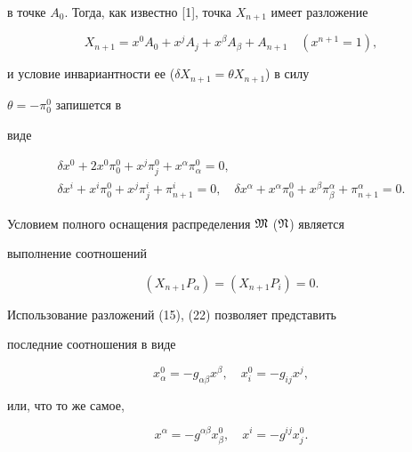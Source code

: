 в точке $A_0$. Тогда, как известно [1], точка $X_{n+1}$ имеет разложение 


\begin{equation} 


X_{n+1}=x^0A_0+x^j A_j+x^\beta A_\beta+A_{n+1}\quad 


(x^{n+1}=1), 


\end{equation} 


и условие инвариантности ее ($\delta X_{n+1}=\theta X_{n+1}$) в силу 


$\theta=-\pi^0_0$ запишется в 


виде 


\begin{equation} 


\begin{array}{c} 


\delta x^0+2x^0\pi^0_0+x^j\pi^0_j+x^\alpha\pi^0_\alpha=0,\\[2mm] 


\delta x^i+x^i\pi^0_0+x^j\pi^i_j+\pi^i_{n+1}=0,\quad 


\delta x^\alpha+x^\alpha\pi^0_0+x^\beta\pi^\alpha_\beta+ 


\pi^\alpha_{n+1}=0. 


\end{array} 


\end{equation} 


 


Условием полного оснащения распределения $\frak M$ ($\frak N$) является 


выполнение соотношений 


$$ 


(X_{n+1}P_\alpha)=(X_{n+1}P_i)=0. 


$$ 


Использование разложений (15), (22) позволяет представить 


последние соотношения в виде 


\begin{equation} 


x^0_\alpha=-g_{\alpha\beta}x^\beta,\quad 


x^0_i=-g_{ij}x^j,\tag{$24_1$} 


\end{equation} 


или, что то же самое, 


\begin{equation} 


x^\alpha=-g^{\alpha\beta}x^0_\beta,\quad 


x^i=-g^{ij}x^0_j.\tag{$24_2$} 


\end{equation} 


